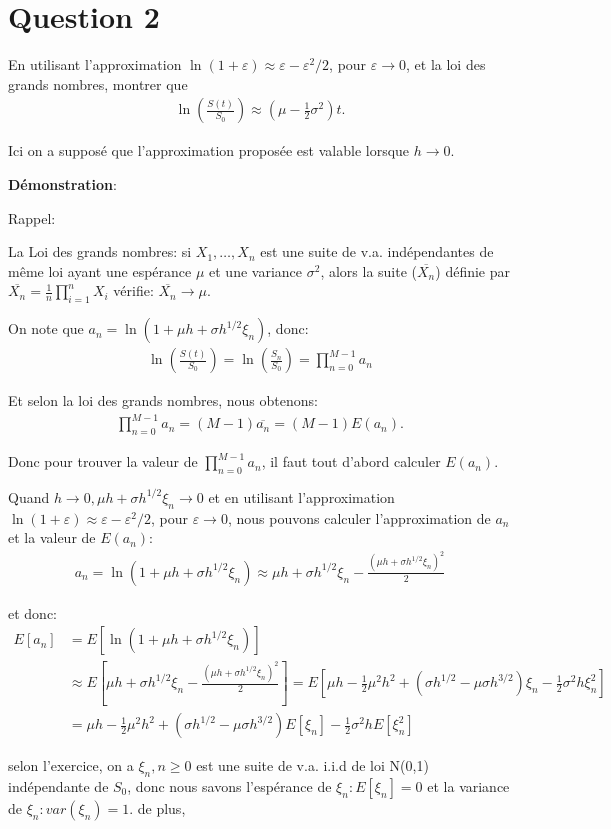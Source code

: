 \documentclass[a4paper,10pt]{report}
\begin{document}
\section{Question 2}
En utilisant l'approximation $\ln (1 + \varepsilon) \approx \varepsilon - \varepsilon^{2} / 2$, pour $\varepsilon \rightarrow 0$, et la loi des grands nombres, montrer que
\begin{align*}
	\ln(\frac{S(t)}{S_{0}}) \approx (\mu - \frac{1}{2} \sigma^{2})t.
\end{align*}
\par Ici on a supposé que l'approximation proposée est valable lorsque $h \rightarrow 0$.

\noindent \textbf{Démonstration}:
\par Rappel: 
\par La Loi des grands nombres: si $X_{1}, \dots, X_{n}$ est une suite de v.a. indépendantes de même loi ayant une espérance $\mu$ et une variance $\sigma^{2}$, alors la suite ($\overline{X_{n}}$) définie par $\overline{X_{n}} = \frac{1}{n} \prod_{i=1}^{n}X_{i}$ vérifie: $\overline{X_{n}} \rightarrow \mu$.
\par On note que $a_{n} = \ln (1 + \mu h + \sigma h^{1/2} \xi_{n})$, donc:
\begin{align*}
	\ln (\frac{S(t)}{S_{0}}) = \ln (\frac{S_{n}}{S_{0}}) = \prod_{n=0}^{M-1} a_{n}
\end{align*}
\par Et selon la loi des grands nombres, nous obtenons:
\begin{align*} 
\prod_{n=0}^{M-1} a_{n} = (M-1) \overline{a_{n}} = (M-1) E(a_{n}).
\end{align*} 
\par Donc pour trouver la valeur de $\prod_{n=0}^{M-1} a_{n}$, il faut tout d'abord calculer $E(a_{n})$.
\par Quand $h \rightarrow 0, \mu h + \sigma h^{1/2} \xi_{n} \rightarrow 0$ et en utilisant l'approximation $\ln (1 + \varepsilon) \approx \varepsilon - \varepsilon^{2} / 2$, pour $\varepsilon \rightarrow 0$, nous pouvons calculer l'approximation de $a_{n}$ et la valeur de $E(a_{n})$:
\begin{align*}
	a_{n} = \ln (1 + \mu h + \sigma h^{1/2} \xi_{n}) \approx \mu h +\sigma h^{1/2} \xi_{n} - \frac{(\mu h + \sigma h^{1/2} \xi_{n})^{2}}{2}
\end{align*}
\par et donc:
\begin{align*}
E[a_{n}] &= E[\ln (1 + \mu h + \sigma h^{1/2} \xi_{n})] \\
&\approx E[\mu h +\sigma h^{1/2} \xi_{n} - \frac{(\mu h + \sigma h^{1/2} \xi_{n})^{2}}{2}] = E[\mu h -\frac{1}{2} \mu^{2} h^{2} + (\sigma h^{1/2} - \mu \sigma h^{3/2}) \xi_{n} -\frac{1}{2} \sigma^{2} h \xi_{n}^{2}]\\
&= \mu h -\frac{1}{2} \mu^{2} h^{2} + (\sigma h^{1/2} - \mu \sigma h^{3/2}) E[\xi_{n}] -\frac{1}{2} \sigma^{2} h E[\xi_{n}^{2}]
\end{align*}
\par selon l'exercice, on a $\xi_{n}, n \geq 0$ est une suite de v.a. i.i.d de loi N(0,1) indépendante de $S_{0}$, donc nous savons l'espérance de $\xi_{n}: E[\xi_{n}] = 0$ et la variance de $\xi_{n}: var(\xi_{n}) = 1$. de plus, 
\end{document}
